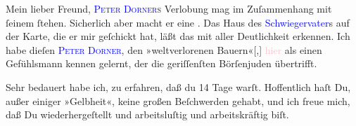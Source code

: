 \pstart{}Mein lieber Freund,\pend
\pstart
           \textsc{\textcolor{blue}{Peter Dorner}{}\ledrightnote{\textcolor{blue}{Peter Dorner}}s} Verlobung mag im
               Zuſammenhang mit ſeinem \label{K_L03449-1v}\label{K_L03449-1h} ſtehen. Sicherlich aber macht er eine \label{K_L03449-2v}\label{K_L03449-2h}.
               Das Haus des \textcolor{blue}{Schwiegervater}{}\ledrightnote{{$\rightarrow$}\textcolor{blue}{?? [Vater von Peter Dorners Verlobter]}}s auf der Karte, die er mir geſchickt hat,  läßt das mit aller Deutlichkeit erkennen. Ich
               habe dieſen \textsc{\textcolor{blue}{Peter Dorner}{}\ledrightnote{\textcolor{blue}{Peter Dorner}}}, den »weltverlorenen \strikeout{\textcolor{gray}{×}} Bauern«{[},{]}{ }\textcolor{pink}{hier}{}\ledrightnote{{$\rightarrow$}\textcolor{pink}{Berlin}} als einen  Gefühlsmann kennen gelernt, der die geriſſenſten Börſenjuden übertrifft.\pend
           
\pstart
           Sehr bedauert habe ich, zu erfahren, {\pb} daß du \strikeout{\textcolor{gray}{×}\-\textcolor{gray}{×}\-\textcolor{gray}{×}}\introOben{}14\introOben{} Tage \label{K_L03449-3v}\label{K_L03449-3h} warſt. Hoffentlich haſt Du, außer einiger »Gelbheit«, keine großen
               Beſchwerden gehabt, und ich freue mich, daß Du wiederhergeſtellt und arbeitsluſtig
               und arbeitskräftig biſt.\pend
           
